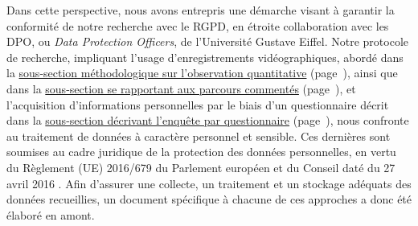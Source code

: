 \begin{refsegment}
Dans cette perspective, nous avons entrepris une démarche visant à garantir la conformité de notre recherche avec le \acrshort{RGPD}, en étroite collaboration avec les \acrfull{DPO}, ou \textsl{Data Protection Officers}, de l'Université Gustave Eiffel. Notre protocole de recherche, impliquant l'usage d'enregistrements vidéographiques, abordé dans la \hyperref[chap3:observation-quantitative]{sous-section méthodologique sur l'observation quantitative} (page~\pageref{chap3:observation-quantitative}), ainsi que dans la \hyperref[chap3:parcours-commente]{sous-section se rapportant aux parcours commentés} (page~\pageref{chap3:parcours-commente}), et l'acquisition d'informations personnelles par le biais d'un questionnaire décrit dans la \hyperref[chap3:questionnaire]{sous-section décrivant l'enquête par questionnaire} (page~\pageref{chap3:questionnaire}), nous confronte au traitement de données à caractère personnel et sensible. Ces dernières sont soumises au cadre juridique de la protection des données personnelles, en vertu du Règlement (UE) 2016/679 du Parlement européen et du Conseil daté du 27 avril 2016 \textcolor{blue}{\autocite[]{cnil_reglement_2018}}. Afin d'assurer une collecte, un traitement et un stockage adéquats des données recueillies, un document spécifique à chacune de ces approches a donc été élaboré en amont.%


\end{refsegment}
